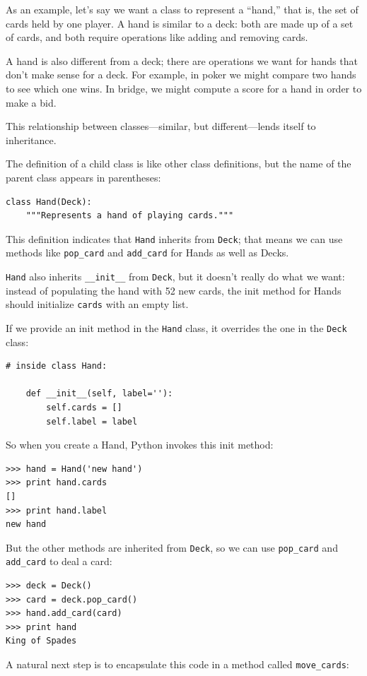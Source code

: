 \documentclass[10pt]{book}
\begin{document}
As an example, let's say we want a class to represent a ``hand,''
that is, the set of cards held by one player.  A hand is similar to a
deck: both are made up of a set of cards, and both require operations
like adding and removing cards.

A hand is also different from a deck; there are operations we want for
hands that don't make sense for a deck.  For example, in poker we
might compare two hands to see which one wins.  In bridge, we might
compute a score for a hand in order to make a bid.

This relationship between classes---similar, but different---lends
itself to inheritance.

The definition of a child class is like other class definitions,
but the name of the parent class appears in parentheses:

\begin{verbatim}
class Hand(Deck):
    """Represents a hand of playing cards."""
\end{verbatim}
%
This definition indicates that {\tt Hand} inherits from {\tt Deck};
that means we can use methods like \verb"pop_card" and \verb"add_card"
for Hands as well as Decks.

{\tt Hand} also inherits \verb"__init__" from {\tt Deck}, but
it doesn't really do what we want: instead of populating the hand
with 52 new cards, the init method for Hands should initialize
{\tt cards} with an empty list.

If we provide an init method in the {\tt Hand} class, it overrides the
one in the {\tt Deck} class:

\begin{verbatim}
# inside class Hand:

    def __init__(self, label=''):
        self.cards = []
        self.label = label
\end{verbatim}
%
So when you create a Hand, Python invokes this init method:

\begin{verbatim}
>>> hand = Hand('new hand')
>>> print hand.cards
[]
>>> print hand.label
new hand
\end{verbatim}
%
But the other methods are inherited from {\tt Deck}, so we can use
\verb"pop_card" and \verb"add_card" to deal a card:

\begin{verbatim}
>>> deck = Deck()
>>> card = deck.pop_card()
>>> hand.add_card(card)
>>> print hand
King of Spades
\end{verbatim}
%
A natural next step is to encapsulate this code in a method
called \verb"move_cards":
\end{document}
